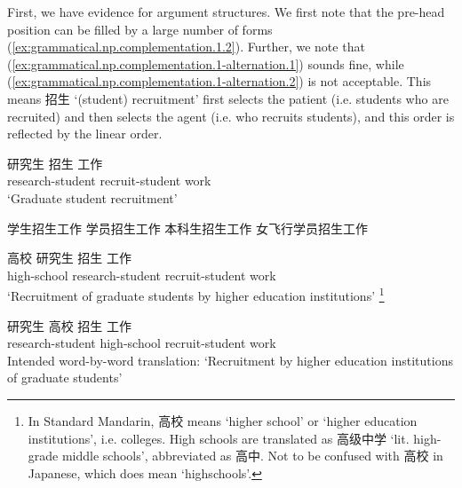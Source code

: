 \documentclass[UTF8, a4paper, oneside, scheme=plain, 12pt]{ctexrep}
\newcommand{\translate}[1]{`#1'}
\begin{document}
First, we have evidence for argument structures. 
We first note that the pre-head position can be filled by a large number of forms
(\ref{ex:grammatical.np.complementation.1.2}).
Further, we note that (\ref{ex:grammatical.np.complementation.1-alternation.1}) sounds fine,
while (\ref{ex:grammatical.np.complementation.1-alternation.2}) is not acceptable.
This means 招生 \translate{(student) recruitment} first selects the patient
(i.e. students who are recruited)
and then selects the agent (i.e. who recruits students),
and this order is reflected by the linear order.

\begin{exe}
    \ex\label{ex:grammatical.np.complementation.1}
    \gll 研究生 招生 工作 \\
    research-student recruit-student work \\
    \glt\translate{Graduate student recruitment} 

    \ex\label{ex:grammatical.np.complementation.1.2}\begin{xlist}
        \ex 学生招生工作
        \ex 学员招生工作
        \ex 本科生招生工作
        \ex 女飞行学员招生工作
    \end{xlist}
    
    \ex\label{ex:grammatical.np.complementation.1-alternation} \begin{xlist}
        \ex \label{ex:grammatical.np.complementation.1-alternation.1}
        \gll 高校 研究生 招生 工作 \\
        high-school research-student recruit-student work \\
        \glt\translate{Recruitment of graduate students by higher education institutions}%
        \footnote{
            In Standard Mandarin, 高校 means \translate{higher school} 
            or \translate{higher education institutions}, i.e. colleges.
            High schools are translated as 高级中学 \translate{lit. high-grade middle schools},
            abbreviated as 高中.
            Not to be confused with 高校 in Japanese,
            which does mean \translate{highschools}.
        }

        \ex \label{ex:grammatical.np.complementation.1-alternation.2}
        \gll *研究生 高校 招生 工作 \\
        research-student high-school recruit-student work \\
        \glt Intended word-by-word translation: \translate{Recruitment by higher education institutions of graduate students}
    \end{xlist}
\end{exe}
\end{document}
